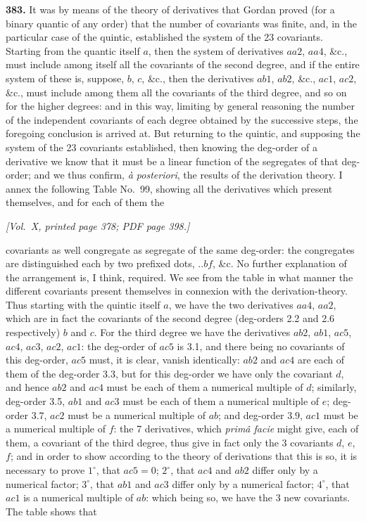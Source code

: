 \documentclass[11pt]{article}
\begin{document}
\noindent\textbf{383.} It was by means of the theory of derivatives that Gordan proved (for a binary quantic of any order) that the number of covariants was finite, and, in the particular case of the quintic, established the system of the 23 covariants. Starting from the quantic itself $a$, then the system of derivatives $aa2$, $aa4$, \&c., must include among itself all the covariants of the second degree, and if the entire system of these is, suppose, $b$, $c$, \&c., then the derivatives $ab1$, $ab2$, \&c., $ac1$, $ac2$, \&c., must include among them all the covariants of the third degree, and so on for the higher degrees: and in this way, limiting by general reasoning the number of the independent covariants of each degree obtained by the successive steps, the foregoing conclusion is arrived at. But returning to the quintic, and supposing the system of the 23 covariants established, then knowing the deg-order of a derivative we know that it must be a linear function of the segregates of that deg-order; and we thus confirm, \emph{\`a posteriori}, the results of the derivation theory. I annex the following Table No.~99, showing all the derivatives which present themselves, and for each of them the

\newpage

\noindent\textit{[Vol.~X, printed page 378; PDF page 398.]}

\medskip

covariants as well congregate as segregate of the same deg-order: the congregates are distinguished each by two prefixed dots, $..bf$, \&c. No further explanation of the arrangement is, I think, required. We see from the table in what manner the different covariants present themselves in connexion with the derivation-theory. Thus starting with the quintic itself $a$, we have the two derivatives $aa4$, $aa2$, which are in fact the covariants of the second degree (deg-orders 2.2 and 2.6 respectively) $b$ and $c$. For the third degree we have the derivatives $ab2$, $ab1$, $ac5$, $ac4$, $ac3$, $ac2$, $ac1$: the deg-order of $ac5$ is 3.1, and there being no covariants of this deg-order, $ac5$ must, it is clear, vanish identically: $ab2$ and $ac4$ are each of them of the deg-order 3.3, but for this deg-order we have only the covariant $d$, and hence $ab2$ and $ac4$ must be each of them a numerical multiple of $d$; similarly, deg-order 3.5, $ab1$ and $ac3$ must be each of them a numerical multiple of $e$; deg-order $3.7$, $ac2$ must be a numerical multiple of $ab$; and deg-order $3.9$, $ac1$ must be a numerical multiple of $f$: the 7 derivatives, which \emph{prim\^a facie} might give, each of them, a covariant of the third degree, thus give in fact only the 3 covariants $d$, $e$, $f$; and in order to show according to the theory of derivations that this is so, it is necessary to prove $1^{\circ}$, that $ac5=0$; $2^{\circ}$, that $ac4$ and $ab2$ differ only by a numerical factor; $3^{\circ}$, that $ab1$ and $ac3$ differ only by a numerical factor; $4^{\circ}$, that $ac1$ is a numerical multiple of $ab$: which being so, we have the 3 new covariants. The table shows that
\end{document}
